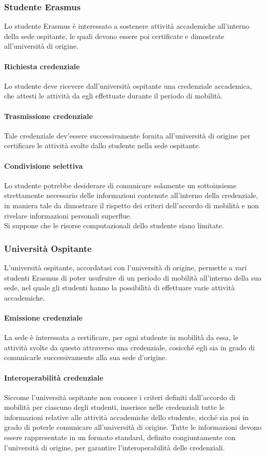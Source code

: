 \documentclass[a4paper,12pt]{article}
\begin{document}
\subsubsection{Studente Erasmus}
Lo studente Erasmus è interessato a sostenere attività accademiche all'interno della sede ospitante, le quali devono essere poi certificate e dimostrate all'università di origine.
\paragraph{Richiesta credenziale} Lo studente deve ricevere dall'università ospitante una credenziale accademica, che attesti le attività da egli effettuate durante il periodo di mobilità.
\paragraph{Trasmissione credenziale} Tale credenziale dev'essere successivamente fornita all'università di origine per certificare le attività svolte dallo studente nella sede ospitante. 
\paragraph{Condivisione selettiva} Lo studente potrebbe desiderare di comunicare solamente un sottoinsieme strettamente necessario delle informazioni contenute all'interno della credenziale, in maniera tale da dimostrare il rispetto dei criteri dell'accordo di mobilità e non rivelare informazioni personali superflue.
\\[0.5em] Si suppone che le risorse computazionali dello studente siano limitate. 

\subsubsection{Università Ospitante}
L'università ospitante, accordatasi con l'università di origine, permette a vari studenti Erasmus di poter usufruire di un periodo di mobilità all'interno della sua sede, nel quale gli studenti hanno la possibilità di effettuare varie attività accademiche.
\paragraph{Emissione credenziale} La sede è interessata a certificare, per ogni studente in mobilità da essa, le attività svolte da questo attraverso una credenziale, cosicché egli sia in grado di comunicarle successivamente alla sua sede d'origine.
\paragraph{Interoperabilità credenziale} Siccome l'università ospitante non conosce i criteri definiti dall'accordo di mobilità per ciascuno degli studenti, inserisce nelle credenziali tutte le informazioni relative alle attività accademiche dello studente, sicché sia poi in grado di poterle comunicare all'università di origine. Tutte le informazioni devono essere rappresentate in un formato standard, definito congiuntamente con l'università di origine, per garantire l'interoperabilità delle credenziali.
\end{document}
